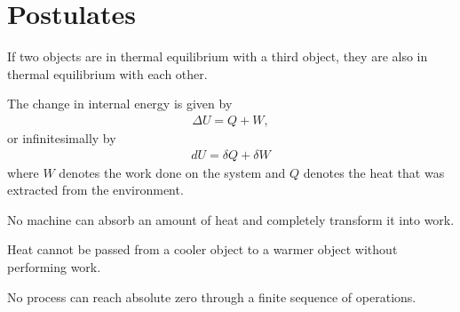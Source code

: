 \section{Postulates}

    \begin{axiom}
        If two objects are in thermal equilibrium with a third object, they are also in thermal equilibrium with each other.
    \end{axiom}
    \begin{axiom}
        The change in internal energy is given by
        \begin{gather}
            \label{thermo:first_law}
            \Delta U = Q + W,
        \end{gather}
        or infinitesimally by
        \begin{gather}
            \label{thermo:first_law_differential}
            dU = \delta Q + \delta W
        \end{gather}
        where $W$ denotes the work done on the system and $Q$ denotes the heat that was extracted from the environment.
    \end{axiom}

    \begin{axiom}
        No machine can absorb an amount of heat and completely transform it into work.
    \end{axiom}
    \begin{axiom}
        Heat cannot be passed from a cooler object to a warmer object without performing work.
    \end{axiom}


    \begin{axiom}
        No process can reach absolute zero through a finite sequence of operations.
    \end{axiom}

